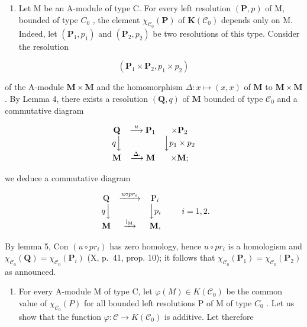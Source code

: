 \begin{enumerate}
\def\labelenumi{\alph{enumi})}
\tightlist
\item
  Let M be an A-module of type C. For every left resolution \((\mathbf{P}, p)\) of M, bounded of type \(C_{0}\) , the element \(\chi_{\mathcal{C}_{0}}(\mathbf{P})\) of \(\mathbf{K}(\mathcal{C}_{0})\) depends only on M. Indeed, let \((\mathbf{P}_{1}, p_{1})\) and \((\mathbf{P}_{2}, p_{2})\) be two resolutions of this type. Consider the resolution
\end{enumerate}

\[
(\mathbf {P} _ {1} \times \mathbf {P} _ {2}, p _ {1} \times p _ {2})
\]

of the A-module \(\mathbf{M} \times \mathbf{M}\) and the homomorphism \(\Delta : x \mapsto (x, x)\) of \(\mathbf{M}\) to \(\mathbf{M} \times \mathbf{M}\) . By Lemma 4, there exists a resolution \((\mathbf{Q}, q)\) of \(\mathbf{M}\) bounded of type \(\mathcal{C}_0\) and a commutative diagram

\[
\begin{array}{c c c} \mathbf {Q} & \stackrel {{u}} {{\longrightarrow}} \mathbf {P} _ {1} & \times \mathbf {P} _ {2} \\ q \Big \downarrow & & \Big \downarrow p _ {1} \times p _ {2} \\ \mathbf {M} & \stackrel {{\Delta .}} {{\longrightarrow}} \mathbf {M} & \times \mathbf {M}; \end{array}
\]

we deduce a commutative diagram

\[
\begin{array}{c c c} \mathrm{Q} & \xrightarrow {u \circ p r _ {i}} & \mathrm{P} _ {i} \\ q \Big \downarrow & & \Big \downarrow p _ {i} \\ \mathbf {M} & \xrightarrow {\mathrm{l} _ {\mathrm{M}}} & \mathbf {M}, \end{array} \qquad i = 1, 2.
\]

By lemma 5, Con \((u \circ pr_i)\) has zero homology, hence \(u \circ pr_i\) is a homologism and \(\chi_{\mathcal{C}_0}(\mathbf{Q}) = \chi_{\mathcal{C}_0}(\mathbf{P}_i)\) (X, p.~41, prop. 10); it follows that \(\chi_{\mathcal{C}_0}(\mathbf{P}_1) = \chi_{\mathcal{C}_0}(\mathbf{P}_2)\) as announced.

\begin{enumerate}
\def\labelenumi{\alph{enumi})}
\setcounter{enumi}{1}
\tightlist
\item
  For every A-module M of type C, let \(\varphi(M) \in K(\mathcal{C}_{0})\) be the common value of \(\chi_{\mathcal{C}_{0}}(P)\) for all bounded left resolutions P of M of type \(C_{0}\) . Let us show that the function \(\varphi : \mathcal{C} \to K(\mathcal{C}_{0})\) is additive. Let therefore
\end{enumerate}

